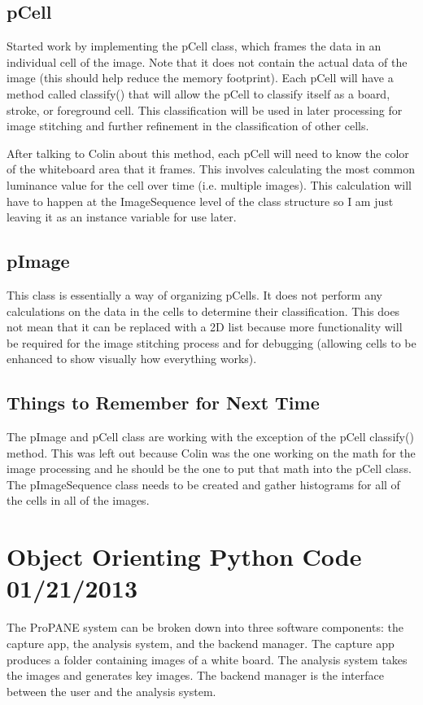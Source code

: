 \documentclass[]{article}
\begin{document}
		\subsection{pCell}
			Started work by implementing the pCell class, which frames the data in an individual cell of the image. Note that it does not contain the actual data of the image (this should help reduce the memory footprint). Each pCell will have a method called classify() that will allow the pCell to classify itself as a board, stroke, or foreground cell. This classification will be used in later processing for image stitching and further refinement in the classification of other cells.
			
			After talking to Colin about this method, each pCell will need to know the color of the whiteboard area that it frames. This involves calculating the most common luminance value for the cell over time (i.e. multiple images). This calculation will have to happen at the ImageSequence level of the class structure so I am just leaving it as an instance variable for use later.
			
		\subsection{pImage}
			This class is essentially a way of organizing pCells. It does not perform any calculations on the data in the cells to determine their classification. This does not mean that it can be replaced with a 2D list because more functionality will be required for the image stitching process and for debugging (allowing cells to be enhanced to show visually how everything works).
			
		\subsection{Things to Remember for Next Time}
			The pImage and pCell class are working with the exception of the pCell classify() method. This was left out because Colin was the one working on the math for the image processing and he should be the one to put that math into the pCell class. The pImageSequence class needs to be created and gather histograms for all of the cells in all of the images. 
	
	
	\section{Object Orienting Python Code 01/21/2013}
		The ProPANE system can be broken down into three software components: the capture app, the analysis system, and the backend manager. The capture app produces a folder containing images of a white board. The analysis system takes the images and generates key images. The backend manager is the interface between the user and the analysis system.
		
\end{document}
